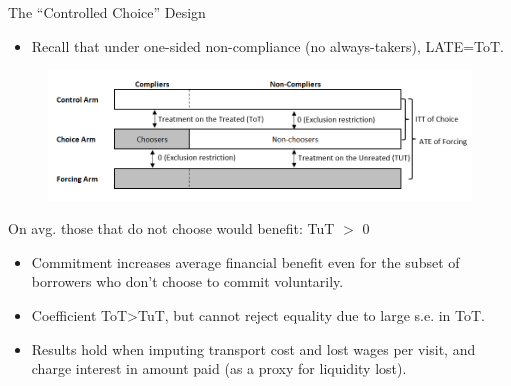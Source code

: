 \documentclass[8pt]{beamer}
\begin{document}
\begin{frame}{The ``Controlled Choice'' Design}
\label{cc_design}
\begin{itemize}
    \item Recall that under one-sided non-compliance (no always-takers), LATE=ToT.
\end{itemize}
\vspace{.2in}
\begin{figure}[H]
    \begin{center}
        \centering
        \includegraphics[width=1.0\textwidth]{Figuras/tot_tut_intuition.png}
    \end{center}
\end{figure}   
 \vfill
\hyperlink{identification_randomized_choice}{}
\end{frame}




\begin{frame}{On avg. those that do not choose would benefit: TuT $>$ 0}
\begin{itemize}
    \vfill \item Commitment increases average financial benefit even for the subset of borrowers who \alert{don't choose to commit voluntarily}.
    \vfill \item Coefficient ToT>TuT, but cannot reject equality due to large s.e. in ToT.
    \vfill \item Results hold when imputing transport cost and lost wages per visit, and charge interest in amount paid (as a proxy for liquidity lost).
\end{itemize}
\vspace{.2in}
\begin{table}[H]
\label{tot_tut}
\begin{center}
\small{}
\end{center}
\end{table}
\end{frame}
\end{document}
